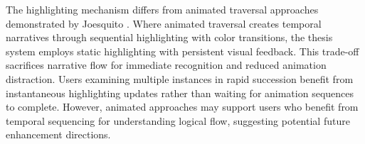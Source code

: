 The highlighting mechanism differs from animated traversal approaches demonstrated by Joesquito \cite{joesquito2024decision}. Where animated traversal creates temporal narratives through sequential highlighting with color transitions, the thesis system employs static highlighting with persistent visual feedback. This trade-off sacrifices narrative flow for immediate recognition and reduced animation distraction. Users examining multiple instances in rapid succession benefit from instantaneous highlighting updates rather than waiting for animation sequences to complete. However, animated approaches may support users who benefit from temporal sequencing for understanding logical flow, suggesting potential future enhancement directions.

